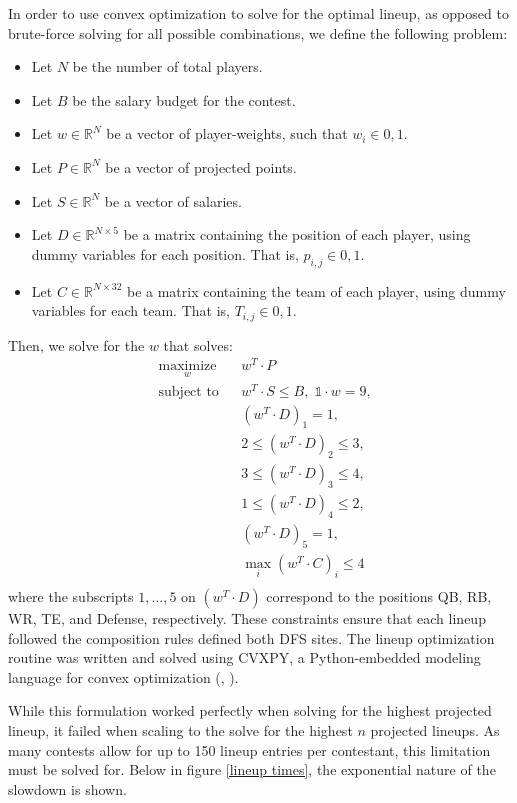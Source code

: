 \documentclass[12pt]{article}
\begin{document}
In order to use convex optimization to solve for the optimal lineup, as opposed to brute-force solving for all possible combinations, we define the following problem: \begin{itemize}
	\item Let $N$ be the number of total players.
	\item Let $B$ be the salary budget for the contest.
	\item Let $w \in \mathbb{R}^{N}$ be a vector of player-weights, such that $w_i \in {0, 1}$.
	\item Let $P \in \mathbb{R}^{N}$ be a vector of projected points.
	\item Let $S \in \mathbb{R}^{N}$ be a vector of salaries.
	\item Let $D \in \mathbb{R}^{N \times 5}$ be a matrix containing the position of  each player, using dummy variables for each position. That is, $p_{i, j} \in {0, 1}$.
	\item Let $C \in \mathbb{R}^{N \times 32}$ be a matrix containing the team of each player, using dummy variables for each team. That is, $T_{i, j} \in {0, 1}$.
\end{itemize}
Then, we solve for the $w$ that solves:
\begin{equation*}
\begin{aligned}
& \underset{w}{\text{maximize}}
& & w^T \cdot P \\
& \text{subject to}
& & w^T \cdot S \leq B, \; \mathds{1} \cdot w = 9, \\
&&& (w^T \cdot D)_1 = 1, \\
&&& 2 \leq (w^T \cdot D)_2 \leq 3, \\
&&& 3 \leq (w^T \cdot D)_3 \leq 4, \\
&&& 1 \leq (w^T \cdot D)_4 \leq 2, \\
&&& (w^T \cdot D)_5 = 1, \\ 
&&& \max_i (w^T \cdot C)_i \leq 4 \\
\end{aligned}
\end{equation*}
where the subscripts $1,\ldots ,5$ on $(w^T \cdot D)$ correspond to the positions QB, RB, WR, TE, and Defense, respectively. These constraints ensure that each lineup followed the composition rules defined both DFS sites. The lineup optimization routine was written and solved using CVXPY, a Python-embedded modeling language for convex optimization (\cite{cvxpy}, \cite{cvxpy_rewriting}). \bigskip

While this formulation worked perfectly when solving for the highest projected lineup, it failed when scaling to the solve for the highest $n$ projected lineups. As many contests allow for up to 150 lineup entries per contestant, this limitation must be solved for. Below in figure \ref{lineup times}, the exponential nature of the slowdown is shown.
\end{document}
